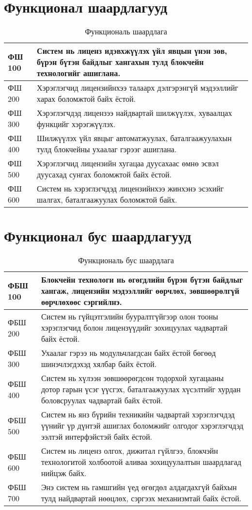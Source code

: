 \section{Функционал шаардлагууд}
\begin{table}[h!]
	\centering
	\begin{tabular}{ |p{2cm}|p{13cm}| }
      \hline
      ФШ 100 & Систем нь лиценз идэвхжүүлэх үйл явцын үнэн зөв, бүрэн бүтэн байдлыг хангахын тулд блокчейн технологийг ашиглана.
      \\ \hline
      ФШ 200 & Хэрэглэгчид  лицензийнхээ талаарх дэлгэрэнгүй мэдээллийг харах боломжтой байх ёстой.
      \\ \hline
      ФШ 300 & Хэрэглэгчдэд лицензээ найдвартай шилжүүлэх, хуваалцах функцийг хэрэгжүүлэх.
      \\ \hline
      ФШ 400 & Шилжүүлэх үйл явцыг автоматжуулах, баталгаажуулахын тулд блокчейны ухаалаг гэрээг ашиглана.
      \\ \hline
      ФШ 500 & Хэрэглэгчид лицензийн хугацаа дуусахаас өмнө эсвэл дуусахад сунгах боломжтой байх ёстой.
      \\ \hline
      ФШ 600 & Систем нь хэрэглэгчдэд лицензийнхээ жинхэнэ эсэхийг шалгах, баталгаажуулах боломжтой байх.
      \\ \hline
	\end{tabular}
   \caption{Функциональ шаардлага}
\end{table}

\newpage
\section{Функционал бус шаардлагууд}
\begin{table}[h!]
	\centering
	\begin{tabular}{ |p{2cm}|p{13cm}| }
		\hline
		ФБШ 100 & Блокчейн технологи нь өгөгдлийн бүрэн бүтэн байдлыг хангаж, лицензийн мэдээллийг өөрчлөх, зөвшөөрөлгүй өөрчлөхөөс сэргийлнэ.
      \\ \hline
		ФБШ 200 & Систем нь гүйцэтгэлийн бууралтгүйгээр олон тооны хэрэглэгчид болон лицензүүдийг зохицуулах чадвартай байх ёстой.
      \\ \hline
		ФБШ 300 & Ухаалаг гэрээ нь модульчлагдсан байх ёстой бөгөөд шинэчлэгдэхэд хялбар байх ёстой.
      \\ \hline
		ФБШ 400 & Систем нь хүлээн зөвшөөрөгдсөн тодорхой хугацааны дотор гарын үсэг үүсгэх, баталгаажуулах хүсэлтийг хурдан боловсруулах чадвартай байх ёстой.
      \\ \hline
		ФБШ 500 & Систем нь янз бүрийн техникийн чадвартай хэрэглэгчдэд үүнийг үр дүнтэй ашиглах боломжийг олгодог хэрэглэгчдэд ээлтэй интерфэйстэй байх ёстой.
      \\ \hline
		ФБШ 600 & Систем нь лиценз олгох, дижитал гүйлгээ, блокчэйн технологитой холбоотой аливаа зохицуулалтын шаардлагад нийцэж байх.
      \\  \hline
      ФБШ 700 & Энэ систем нь гамшгийн үед өгөгдөл алдагдахгүй байхын тулд найдвартай нөөцлөх, сэргээх механизмтай байх ёстой.
      \\ \hline
	\end{tabular}
   \caption{Функциональ бус шаардлага}
\end{table}

